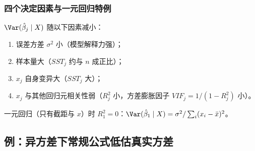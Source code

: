 \subsubsection{四个决定因素与一元回归特例}

$\Var(\hat\beta_j\mid X)$ 随以下因素减小：
\begin{enumerate}[label=(\arabic*)]
  \item 误差方差 $\sigma^2$ 小（模型解释力强）；
  \item 样本量大（$SST_j$ 约与 $n$ 成正比）；
  \item $x_j$ 自身变异大（$SST_j$ 大）；
  \item $x_j$ 与其他回归元相关性弱（$R_j^2$ 小，方差膨胀因子 $VIF_j=1/(1-R_j^2)$ 小）。
\end{enumerate}
一元回归（只有截距与 $x$）时 $R_1^2=0$：$\Var(\hat\beta_1\mid X)=\sigma^2/\sum_i(x_i-\bar x)^2$。

\subsection{例：异方差下常规公式低估真实方差}

